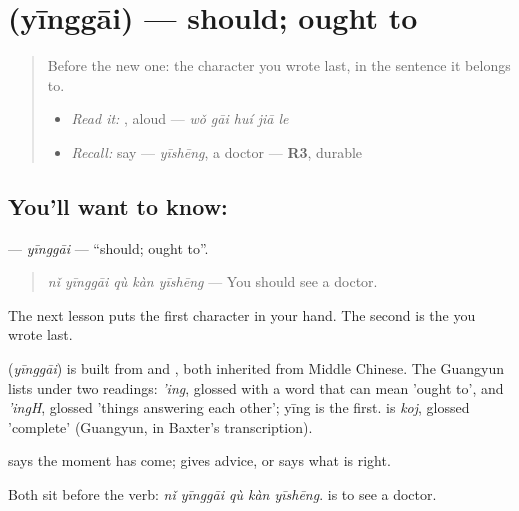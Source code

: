 \section[\texorpdfstring{\zh{应该} (yīnggāi)}{应该 (yīnggāi)}]{ (yīnggāi) — should; ought to}

\label{lesson:ZH-C282-yinggai}



\begin{quote}
Before the new one: the character you wrote last, in the sentence it belongs to.

\begin{itemize}
\raggedright
  \item \emph{Read it:} , aloud — \emph{wǒ gāi huí jiā le}
  \item \emph{Recall:} say  — \emph{yīshēng}, a doctor — \textbf{R3}, durable
\end{itemize}
\end{quote}

\subsection*{You'll want to know: }
\textbf{} — \emph{yīnggāi} — \textquotedblleft{}should; ought to\textquotedblright{}.

\begin{quote}
\textbf{} \emph{nǐ yīnggāi qù kàn yīshēng} — You should see a doctor.
\end{quote}

The next lesson puts the first character in your hand. The second is the  you wrote last.

\begin{cousinweb}
\textbf{} (\emph{yīnggāi}) is built from  and , both inherited from Middle Chinese. The Guangyun lists  under two readings: \emph{'ing}, glossed with a word that can mean 'ought to', and \emph{'ingH}, glossed 'things answering each other'; yīng is the first.  is \emph{koj}, glossed 'complete' (Guangyun, in Baxter's transcription).
\end{cousinweb}

\begin{grammarlens}[title={What you've built}]
 says the moment has come;  gives advice, or says what is right.

Both sit before the verb: \textbf{} \emph{nǐ yīnggāi qù kàn yīshēng}.  is to see a doctor.
\end{grammarlens}

